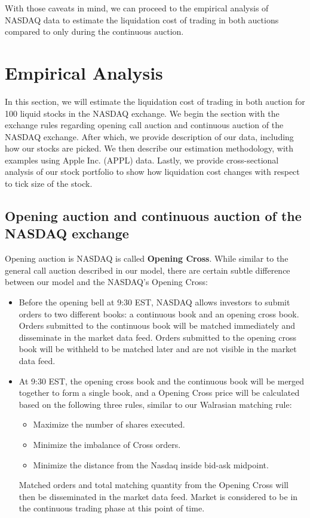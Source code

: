 \documentclass{article}
\begin{document}
With those caveats in mind, we can proceed to the empirical analysis of NASDAQ data to estimate the liquidation cost of trading in both auctions compared to only during the continuous auction.

\section{Empirical Analysis}\label{sec:EmpiricalAnalysis}

In this section, we will estimate the liquidation cost of trading in both auction for 100 liquid stocks in the NASDAQ exchange. We begin the section with the exchange rules regarding opening call auction and continuous auction of the NASDAQ exchange. After which, we provide description of our data, including how our stocks are picked. We then describe our estimation methodology, with examples using Apple Inc. (APPL) data. Lastly, we provide cross-sectional analysis of our stock portfolio to show how liquidation cost changes with respect to tick size of the stock.

\subsection{Opening auction and continuous auction of the NASDAQ exchange}

Opening auction is NASDAQ is called \textbf{Opening Cross}. While similar to the general call auction described in our model, there are certain subtle difference between our model and the NASDAQ's Opening Cross:
\begin{itemize}
  \item Before the opening bell at 9:30 EST, NASDAQ allows investors to submit orders to two different books: a continuous book and an opening cross book. Orders submitted to the continuous book will be matched immediately and disseminate in the market data feed. Orders submitted to the opening cross book will be withheld to be matched later and are not visible in the market data feed.
  \item At 9:30 EST, the opening cross book and the continuous book will be merged together to form a single book, and a Opening Cross price will be calculated based on the following three rules, similar to our Walrasian matching rule:
  \begin{itemize}
    \item Maximize the number of shares executed.
    \item Minimize the imbalance of Cross orders.
    \item Minimize the distance from the Nasdaq inside bid-ask midpoint.
  \end{itemize}
  Matched orders and total matching quantity from the Opening Cross will then be disseminated in the market data feed. Market is considered to be in the continuous trading phase at this point of time.  
\end{itemize}
\end{document}
